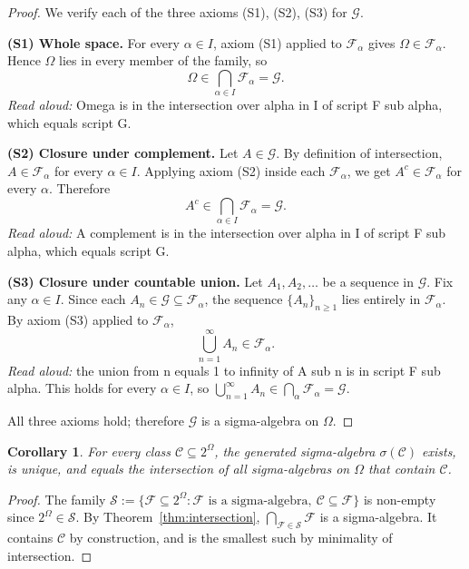 \documentclass[11pt]{article}
\newtheorem{corollary}[theorem]{Corollary}
\theoremstyle{definition}
\begin{document}
\begin{proof}
We verify each of the three axioms (S1), (S2), (S3) for $\mathcal{G}$.

\medskip
\noindent\textbf{(S1) Whole space.} For every $\alpha \in I$, axiom (S1) applied to $\mathcal{F}_{\alpha}$ gives $\Omega \in \mathcal{F}_{\alpha}$. Hence $\Omega$ lies in every member of the family, so
\[
\Omega \in \bigcap_{\alpha \in I} \mathcal{F}_{\alpha} = \mathcal{G}.
\]
\emph{Read aloud:} Omega is in the intersection over alpha in I of script F sub alpha, which equals script G.

\medskip
\noindent\textbf{(S2) Closure under complement.} Let $A \in \mathcal{G}$. By definition of intersection, $A \in \mathcal{F}_{\alpha}$ for every $\alpha \in I$. Applying axiom (S2) inside each $\mathcal{F}_{\alpha}$, we get $A^{c} \in \mathcal{F}_{\alpha}$ for every $\alpha$. Therefore
\[
A^{c} \in \bigcap_{\alpha \in I} \mathcal{F}_{\alpha} = \mathcal{G}.
\]
\emph{Read aloud:} A complement is in the intersection over alpha in I of script F sub alpha, which equals script G.

\medskip
\noindent\textbf{(S3) Closure under countable union.} Let $A_{1}, A_{2}, \ldots$ be a sequence in $\mathcal{G}$. Fix any $\alpha \in I$. Since each $A_{n} \in \mathcal{G} \subseteq \mathcal{F}_{\alpha}$, the sequence $\{A_{n}\}_{n \ge 1}$ lies entirely in $\mathcal{F}_{\alpha}$. By axiom (S3) applied to $\mathcal{F}_{\alpha}$,
\[
\bigcup_{n=1}^{\infty} A_{n} \in \mathcal{F}_{\alpha}.
\]
\emph{Read aloud:} the union from n equals 1 to infinity of A sub n is in script F sub alpha.
This holds for every $\alpha \in I$, so $\bigcup_{n=1}^{\infty} A_{n} \in \bigcap_{\alpha} \mathcal{F}_{\alpha} = \mathcal{G}$.

\medskip
All three axioms hold; therefore $\mathcal{G}$ is a sigma-algebra on $\Omega$.
\end{proof}

\begin{corollary}
For every class $\mathcal{C} \subseteq 2^{\Omega}$, the generated sigma-algebra $\sigma(\mathcal{C})$ exists, is unique, and equals the intersection of all sigma-algebras on $\Omega$ that contain $\mathcal{C}$.
\end{corollary}

\begin{proof}
The family $\mathcal{S} := \{\mathcal{F} \subseteq 2^{\Omega} : \mathcal{F} \text{ is a sigma-algebra},\ \mathcal{C} \subseteq \mathcal{F}\}$ is non-empty since $2^{\Omega} \in \mathcal{S}$. By Theorem~\ref{thm:intersection}, $\bigcap_{\mathcal{F} \in \mathcal{S}} \mathcal{F}$ is a sigma-algebra. It contains $\mathcal{C}$ by construction, and is the smallest such by minimality of intersection.
\end{proof}
\end{document}
